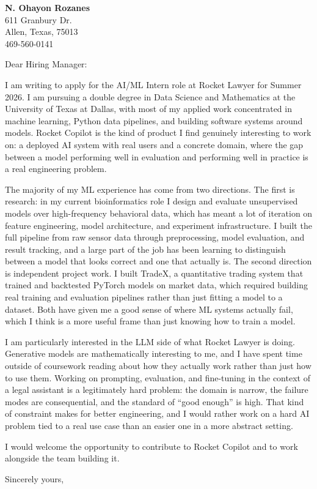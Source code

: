 \documentclass{letter}
\begin{document}
\signature{N. Ohayon Rozanes}
\longindentation=0pt
\let\raggedleft\raggedright

\begin{letter}{}

  \begin{center}
    {\large\bf N. Ohayon Rozanes} \\
    {611 Granbury Dr. \\ Allen, Texas, 75013 \\ 469-560-0141}
  \end{center} \vfill

  \opening{Dear Hiring Manager:}

  \noindent I am writing to apply for the AI/ML Intern role at Rocket
  Lawyer for Summer 2026. I am pursuing a double degree in Data Science
  and Mathematics at the University of Texas at Dallas, with most of my
  applied work concentrated in machine learning, Python data pipelines,
  and building software systems around models. Rocket Copilot is the
  kind of product I find genuinely interesting to work on: a deployed
  AI system with real users and a concrete domain, where the gap between
  a model performing well in evaluation and performing well in practice
  is a real engineering problem.

  \noindent The majority of my ML experience has come from two directions.
  The first is research: in my current bioinformatics role I design and
  evaluate unsupervised models over high-frequency behavioral data,
  which has meant a lot of iteration on feature engineering, model
  architecture, and experiment infrastructure. I built the full pipeline
  from raw sensor data through preprocessing, model evaluation, and
  result tracking, and a large part of the job has been learning to
  distinguish between a model that looks correct and one that actually
  is. The second direction is independent project work. I built TradeX,
  a quantitative trading system that trained and backtested PyTorch
  models on market data, which required building real training and
  evaluation pipelines rather than just fitting a model to a dataset.
  Both have given me a good sense of where ML systems actually fail,
  which I think is a more useful frame than just knowing how to train
  a model.

  \noindent I am particularly interested in the LLM side of what Rocket
  Lawyer is doing. Generative models are mathematically interesting to
  me, and I have spent time outside of coursework reading about how
  they actually work rather than just how to use them. Working on
  prompting, evaluation, and fine-tuning in the context of a legal
  assistant is a legitimately hard problem: the domain is narrow, the
  failure modes are consequential, and the standard of ``good enough''
  is high. That kind of constraint makes for better engineering, and I
  would rather work on a hard AI problem tied to a real use case than
  an easier one in a more abstract setting.

  \noindent I would welcome the opportunity to contribute to Rocket
  Copilot and to work alongside the team building it.

  \closing{Sincerely yours,}

\end{letter}
\end{document}
